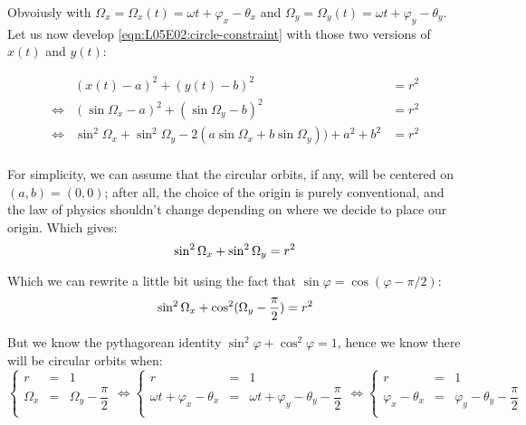 \documentclass[solutions.tex]{subfiles}
\begin{document}
Obvoiusly with $\Omega_x = \Omega_x(t) = \omega t + \varphi_x - \theta_x$
and $\Omega_y = \Omega_y(t) = \omega t + \varphi_y -\theta_y$. \\

Let us now develop \eqref{eqn:L05E02:circle-constraint} with those two
versions of $x(t)$ and $y(t)$:

\begin{equation*} \begin{aligned}
	~ & (x(t)-a)^2+(y(t)-b)^2 &= r^2 \\
	\Leftrightarrow & (\sin\Omega_x - a)^2
	+(\sin\Omega_y-b)^2 &= r^2 \\
	\Leftrightarrow & \sin^2\Omega_x+\sin^2\Omega_y -2(a\sin\Omega_x+b\sin\Omega_y))+a^2+b^2 &= r^2 \\
\end{aligned} \end{equation*}

For simplicity, we can assume that the circular orbits, if any, will be centered
on $(a,b)=(0,0)$; after all, the choice of the origin is purely conventional,
and the law of physics shouldn't change depending on where we decide to place
our origin. Which gives:
\[
	\sin^2\Omega_x+\sin^2\Omega_y = r^2 \\
\]

Which we can rewrite a little bit using the fact that
$\sin\varphi = \cos(\varphi-\pi/2)$:
\[
	\sin^2\Omega_x+\cos^2(\Omega_y-\frac{\pi}{2}) = r^2 \\
\]

But we know the pythagorean identity $\sin^2\varphi+\cos^2\varphi = 1$,
hence we know there will be circular orbits when:
\begin{equation*}
	\left\{
	\begin{array}{lll}
		r &=& 1 \\
		\Omega_x &=& \Omega_y - \dfrac{\pi}{2} \\
	\end{array}
	\right.
	\Leftrightarrow
	\left\{
	\begin{array}{lll}
		r &=& 1 \\
		\omega t + \varphi_x - \theta_x &=& \omega t + \varphi_y -\theta_y - \dfrac{\pi}{2} \\
	\end{array}
	\right.
	\Leftrightarrow
	\left\{
	\begin{array}{lll}
		r &=& 1 \\
		\varphi_x - \theta_x &=& \varphi_y -\theta_y - \dfrac{\pi}{2} \\
	\end{array}
	\right.
\end{equation*}
\end{document}
